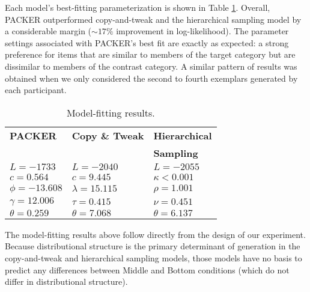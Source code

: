 \documentclass[10pt,letterpaper]{article}
\begin{document}
Each model's best-fitting parameterization is shown in Table \ref{table:model-fits}. Overall, PACKER outperformed copy-and-tweak and the hierarchical sampling model by a considerable margin ($\sim17\%$ improvement in log-likelihood). The parameter settings associated with PACKER's best fit are exactly as expected: a strong preference for items that are similar to members of the target category but are dissimilar to members of the contrast category. A similar pattern of results was obtained when we only considered the second to fourth exemplars generated by each participant.
\begin{table}[ht!]
\centering
\caption{Model-fitting results.}
\label{table:model-fits}
\begin{tabular}{ l l l}
\\
 \textbf{PACKER} & \textbf{Copy \& Tweak} & \textbf{Hierarchical} \\
 & & \textbf{Sampling} \\ \hline
 $L = -1733$ & $L = -2040$ & $L = -2055$  \\ 
 $c=0.564$ & $c=9.445$  & $\kappa<0.001$\\
$\phi=-13.608$& $\lambda=15.115$ & $\rho=1.001$ \\ 
$\gamma=12.006$  & $\tau=0.415$ & $\nu=0.451$  \\ 
 $\theta=0.259$  & $\theta=7.068$ & $\theta=6.137$  \\ 
\end{tabular}
\end{table}

The model-fitting results above follow directly from the design of our experiment. Because distributional structure is the primary determinant of generation in the copy-and-tweak and hierarchical sampling models, those models have no basis to predict any differences between Middle and Bottom conditions (which do not differ in distributional structure). 
\end{document}
